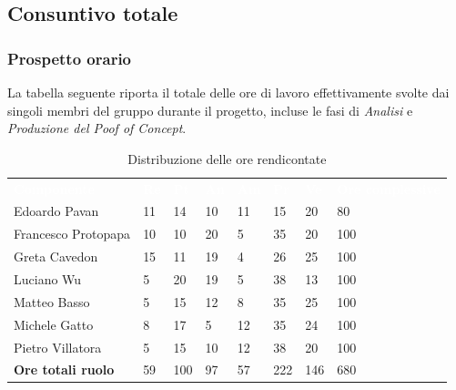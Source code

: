 


\subsection{Consuntivo totale}
\subsubsection{Prospetto orario}

La tabella seguente riporta il totale delle ore di lavoro effettivamente svolte dai singoli membri del gruppo durante il progetto, incluse le fasi di \textit{Analisi} e \textit{Produzione del Poof of Concept}.

\begin{table}[H]
	\begin{center}
	\renewcommand{\arraystretch}{1.25}
	\begin{tabular}{ m{}<{\centering}  m{}<{\centering} m{}<{\centering} m{}<{\centering}  m{}<{\centering}  m{}<{\centering}  m{}<{\centering}  m{}<{\centering}   }
		\rowcolor{darkblue}
		\textcolor{white}{\textbf{Componente}} &\textcolor{white}{\textbf{Re}}&\textcolor{white}{\textbf{Pt}}&\textcolor{white}{\textbf{An}}&\textcolor{white}{\textbf{Am}}&\textcolor{white}{\textbf{Pr}}&\textcolor{white}{\textbf{Ve}}&\textcolor{white}{\textbf{Ore complessive}}\\ 
		Edoardo Pavan & 11 & 14 & 10 & 11 & 15 & 20 & 80 \\	
		
		Francesco Protopapa & 10 & 10 & 20 & 5 & 35 & 20 & 100 \\
	
		Greta Cavedon & 15 & 11 & 19 & 4 & 26 & 25 & 100 \\
		
		Luciano Wu & 5 & 20 & 19 & 5 & 38 & 13 & 100 \\
		
		Matteo Basso & 5 & 15 & 12 & 8 & 35 & 25 & 100 \\
		
		Michele Gatto & 8 & 17 & 5 & 12 & 35 & 24 & 100 \\
		
		Pietro Villatora & 5 & 15 & 10 & 12 & 38 & 20 & 100 \\
		
		\textbf{Ore totali ruolo} & 59 & 100 & 97 & 57 & 222 & 146 & 680 \\
	
	\end{tabular}
	\caption{Distribuzione delle ore rendicontate}
	\end{center}
	\end{table}

